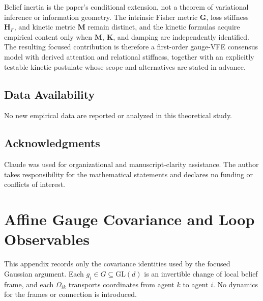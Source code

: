 \documentclass[12pt]{article}
\begin{document}
Belief inertia is the paper's conditional extension, not a theorem of variational inference or information geometry. The intrinsic Fisher metric $\mathbf G$, loss stiffness $\mathbf H_F$, and kinetic metric $\mathbf M$ remain distinct, and the kinetic formulas acquire empirical content only when $\mathbf M$, $\mathbf K$, and damping are independently identified. The resulting focused contribution is therefore a first-order gauge-VFE consensus model with derived attention and relational stiffness, together with an explicitly testable kinetic postulate whose scope and alternatives are stated in advance.

\subsection*{Data Availability}
No new empirical data are reported or analyzed in this theoretical study.


\subsection*{Acknowledgments}
Claude was used for organizational and manuscript-clarity assistance.  The author takes responsibility for the mathematical statements and declares no funding or conflicts of interest.

\appendix


\section{Affine Gauge Covariance and Loop Observables}
\label{app:gauge}

This appendix records only the covariance identities used by the focused Gaussian argument. Each $g_i\in G\subseteq\mathrm{GL}(d)$ is an invertible change of local belief frame, and each $\Omega_{ik}$ transports coordinates from agent $k$ to agent $i$. No dynamics for the frames or connection is introduced.

\end{document}
